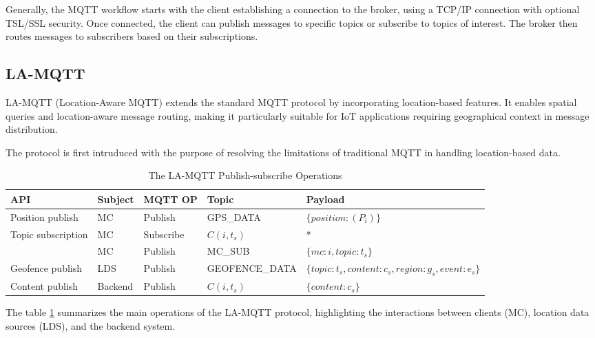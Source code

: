 Generally, the MQTT workflow starts with the client establishing a connection to the broker, using a TCP/IP connection with optional TSL/SSL security. Once connected, the client can publish messages to specific topics or subscribe to topics of interest. The broker then routes messages to subscribers based on their subscriptions.

\subsection{LA-MQTT} \label{sec:la-mqtt}
LA-MQTT (Location-Aware MQTT) extends the standard MQTT protocol by incorporating location-based features. It enables spatial queries and location-aware message routing, making it particularly suitable for IoT applications requiring geographical context in message distribution.

The protocol is first intruduced with the purpose of resolving the limitations of traditional MQTT in handling location-based data\cite{montori2022lamqtt}.

\begin{table}[h]
\small
\begin{tabularx}{\linewidth}{|l|X|X|X|p{4cm}|}
\hline
\textbf{API} & \textbf{Subject} & \textbf{MQTT OP} & \textbf{Topic} & \textbf{Payload} \\ \hline
Position publish & MC & Publish & GPS\_DATA & $\{position: ( P_i )\}$ \\ \hline
Topic subscription & MC & Subscribe & $C(i, t_s)$ & * \\ \cline{2-5}
 & MC & Publish & MC\_SUB & $\{ mc: i, topic: t_s \}$ \\ \hline
Geofence publish & LDS & Publish & GEOFENCE\_DATA & $\{topic: t_s, content: c_s, $\newline$region: g_s, event: e_s\}$ \\ \hline
Content publish & Backend & Publish & $C(i, t_s)$ & $\{content: c_s\}$ \\ \hline
\end{tabularx}
\caption{The LA-MQTT Publish-subscribe Operations}
\label{table:la-mqtt}
\end{table}

The table \ref{table:la-mqtt} summarizes the main operations of the LA-MQTT protocol, highlighting the interactions between clients (MC), location data sources (LDS), and the backend system.

